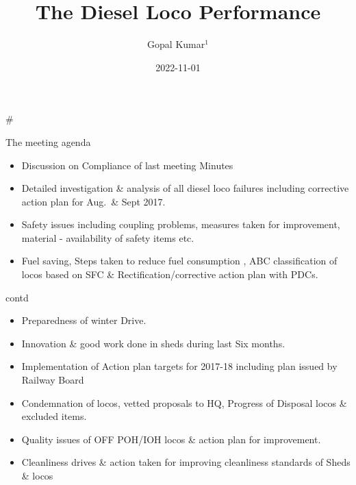 \documentclass[
  ignorenonframetext,
]{beamer}
\title{The Diesel Loco Performance}
\author{Gopal Kumar\(^1\)}
\date{2022-11-01}
\institute{\(^1\)CMPE(Diesel)}
\providecommand{\tightlist}{%
  \setlength{\itemsep}{0pt}\setlength{\parskip}{0pt}}
\begin{document}
\frame{\titlepage}

\begin{frame}[allowframebreaks]
  \tableofcontents[hideallsubsections]
\end{frame}
\begin{frame}
\#
\end{frame}

\begin{frame}{The meeting agenda}
\protect\hypertarget{the-meeting-agenda}{}
\begin{itemize}[<+->]
\tightlist
\item
  Discussion on Compliance of last meeting Minutes
\item
  Detailed investigation \& analysis of all diesel loco failures
  including corrective action plan for Aug.~\& Sept 2017.
\item
  Safety issues including coupling problems, measures taken for
  improvement, material - availability of safety items etc.
\item
  Fuel saving, Steps taken to reduce fuel consumption , ABC
  classification of locos based on SFC \& Rectification/corrective
  action plan with PDCs.
\end{itemize}

\begin{block}{contd}
\protect\hypertarget{contd}{}
\begin{itemize}[<+->]
\tightlist
\item
  Preparedness of winter Drive.
\item
  Innovation \& good work done in sheds during last Six months.
\item
  Implementation of Action plan targets for 2017-18 including plan
  issued by Railway Board
\item
  Condemnation of locos, vetted proposals to HQ, Progress of Disposal
  locos \& excluded items.
\item
  Quality issues of OFF POH/IOH locos \& action plan for improvement.
\item
  Cleanliness drives \& action taken for improving cleanliness standards
  of Sheds \& locos
\end{itemize}
\end{block}
\end{frame}
\end{document}
